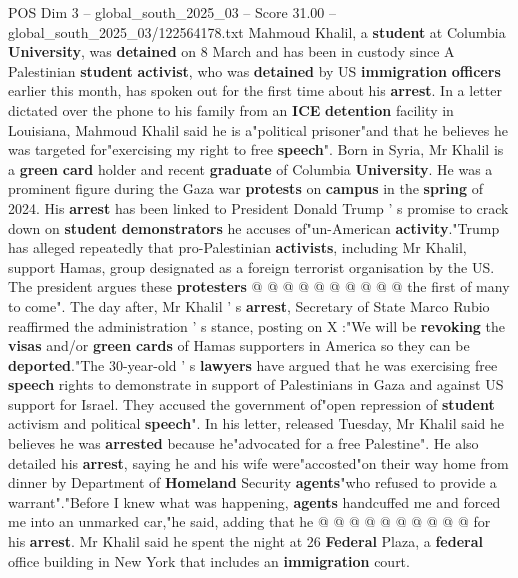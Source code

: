 \begin{textsample}{POS Dim 3 – global\_south\_2025\_03 – Score 31.00 – global\_south\_2025\_03/122564178.txt}  \label{ex:f3_pos_034}
Mahmoud Khalil, a \textbf{student} at Columbia \textbf{University}, was \textbf{detained} on 8 March and has been in custody since A Palestinian \textbf{student} \textbf{activist}, who was \textbf{detained} by US \textbf{immigration} \textbf{officers} earlier this month, has spoken out for the first time about his \textbf{arrest}.
In a letter dictated over the phone to his family from an \textbf{ICE} \textbf{detention} facility in Louisiana, Mahmoud Khalil said he is a"political prisoner"and that he believes he was targeted for"exercising my right to free \textbf{speech}".
Born in Syria, Mr Khalil is a \textbf{green} \textbf{card} holder and recent \textbf{graduate} of Columbia \textbf{University}.
He was a prominent figure during the Gaza war \textbf{protests} on \textbf{campus} in the \textbf{spring} of 2024.
His \textbf{arrest} has been linked to President Donald Trump ' s promise to crack down on \textbf{student} \textbf{demonstrators} he accuses of"un-American \textbf{activity}."Trump has alleged repeatedly that pro-Palestinian \textbf{activists}, including Mr Khalil, support Hamas, group designated as a foreign terrorist organisation by the US.
The president argues these \textbf{protesters} @ @ @ @ @ @ @ @ @ @ the first of many to come".
The day after, Mr Khalil ' s \textbf{arrest}, Secretary of State Marco Rubio reaffirmed the administration ' s stance, posting on X :"We will be \textbf{revoking} the \textbf{visas} and/or \textbf{green} \textbf{cards} of Hamas supporters in America so they can be \textbf{deported}."The 30-year-old ' s \textbf{lawyers} have argued that he was exercising free \textbf{speech} rights to demonstrate in support of Palestinians in Gaza and against US support for Israel.
They accused the government of"open repression of \textbf{student} activism and political \textbf{speech}".
In his letter, released Tuesday, Mr Khalil said he believes he was \textbf{arrested} because he"advocated for a free Palestine".
He also detailed his \textbf{arrest}, saying he and his wife were"accosted"on their way home from dinner by Department of \textbf{Homeland} Security \textbf{agents}"who refused to provide a warrant"."Before I knew what was happening, \textbf{agents} handcuffed me and forced me into an unmarked car,"he said, adding that he @ @ @ @ @ @ @ @ @ @ for his \textbf{arrest}.
Mr Khalil said he spent the night at 26 \textbf{Federal} Plaza, a \textbf{federal} office building in New York that includes an \textbf{immigration} court.

\end{textsample}
